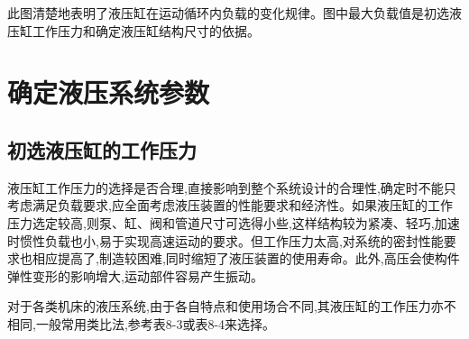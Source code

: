 此图清楚地表明了液压缸在运动循环内负载的变化规律。图中最大负载值是初选液压缸工作压力和确定液压缸结构尺寸的依据。

\section{确定液压系统参数}
\subsection{初选液压缸的工作压力}
液压缸工作压力的选择是否合理,直接影响到整个系统设计的合理性,确定时不能只考虑满足负载要求,应全面考虑液压装置的性能要求和经济性。如果液压缸的工作压力选定较高,则泵、缸、阀和管道尺寸可选得小些,这样结构较为紧凑、轻巧,加速时惯性负载也小,易于实现高速运动的要求。但工作压力太高,对系统的密封性能要求也相应提高了,制造较困难,同时缩短了液压装置的使用寿命。此外,高压会使构件弹性变形的影响增大,运动部件容易产生振动。

对于各类机床的液压系统,由于各自特点和使用场合不同,其液压缸的工作压力亦不相同,一般常用类比法,参考表8-3或表8-4来选择。